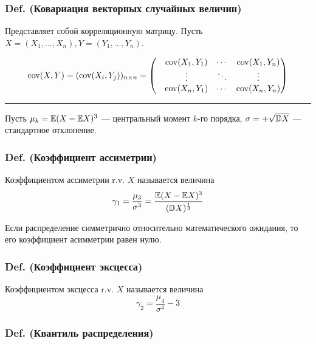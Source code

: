 \subsubsection{Def. (Ковариация векторных случайных
величин)}\label{def.-ux43aux43eux432ux430ux440ux438ux430ux446ux438ux44f-ux432ux435ux43aux442ux43eux440ux43dux44bux445-ux441ux43bux443ux447ux430ux439ux43dux44bux445-ux432ux435ux43bux438ux447ux438ux43d}

Представляет собой корреляционную матрицу. Пусть
\(X = (X_1, \ldots, X_n), Y = (Y_1, \ldots, Y_n)\).

\[\mathrm{cov}(X,Y) = (\mathrm{cov} (X_i, Y_j))_{n\times n} =
\begin{pmatrix}
&\mathrm{cov}(X_1, Y_1) & \cdots & \mathrm{cov}(X_1, Y_n) \\
&\vdots         & \ddots & \vdots         \\
&\mathrm{cov}(X_n, Y_1) & \cdots & \mathrm{cov}(X_n, Y_n)
\end{pmatrix}\]

\begin{center}\rule{0.5\linewidth}{\linethickness}\end{center}

Пусть \({\mu_k = \mathbb E (X - \mathbb E X)^3}\) --- центральный момент \(k\)-го
порядка, \({\sigma = +\sqrt{\mathbb D X}}\) --- стандартное отклонение.

\subsubsection{Def. (Коэффициент
ассиметрии)}\label{def.-ux43aux43eux44dux444ux444ux438ux446ux438ux435ux43dux442-ux430ux441ux441ux438ux43cux435ux442ux440ux438ux438}

Коэффициентом ассиметрии r.v. \(X\) называется величина
\[\gamma_1 = \frac{\mu_3}{\sigma^3} = \frac{ \mathbb E (X-\mathbb E X)^3 }{ (\mathbb D X)^{\frac{1}{3}}}\]

Если распределение симметрично относительно математического ожидания, то
его коэффициент асимметрии равен нулю.

\subsubsection{Def. (Коэффициент
эксцесса)}\label{def.-ux43aux43eux44dux444ux444ux438ux446ux438ux435ux43dux442-ux44dux43aux441ux446ux435ux441ux441ux430}

Коэффициентом эксцесса r.v. \(X\) называется величина
\[\gamma_2 = \frac{\mu_4}{\sigma^4} - 3\]

\subsubsection{Def. (Квантиль
распределения)}\label{def.-ux43aux432ux430ux43dux442ux438ux43bux44c-ux440ux430ux441ux43fux440ux435ux434ux435ux43bux435ux43dux438ux44f}

